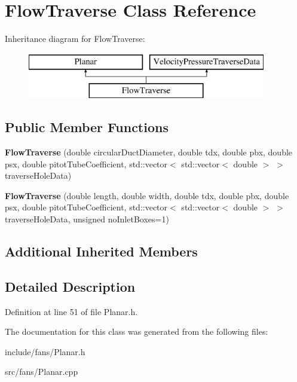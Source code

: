 \hypertarget{class_flow_traverse}{}\section{Flow\+Traverse Class Reference}
\label{class_flow_traverse}
Inheritance diagram for Flow\+Traverse\+:\begin{figure}[H]
\begin{center}
\leavevmode
\includegraphics[height=2.000000cm]{dc/dd3/class_flow_traverse}
\end{center}
\end{figure}
\subsection*{Public Member Functions}
\begin{DoxyCompactItemize}
\item 
\mbox{\label{class_flow_traverse_a95f14b9d4fb9722bad65752022813d06}} 
{\bfseries Flow\+Traverse} (double circular\+Duct\+Diameter, double tdx, double pbx, double psx, double pitot\+Tube\+Coefficient, std\+::vector$<$ std\+::vector$<$ double $>$ $>$ traverse\+Hole\+Data)
\item 
\mbox{\label{class_flow_traverse_ac96fdb9b848320a5fa9a8585ce6c0214}} 
{\bfseries Flow\+Traverse} (double length, double width, double tdx, double pbx, double psx, double pitot\+Tube\+Coefficient, std\+::vector$<$ std\+::vector$<$ double $>$ $>$ traverse\+Hole\+Data, unsigned no\+Inlet\+Boxes=1)
\end{DoxyCompactItemize}
\subsection*{Additional Inherited Members}


\subsection{Detailed Description}


Definition at line 51 of file Planar.\+h.



The documentation for this class was generated from the following files\+:\begin{DoxyCompactItemize}
\item 
include/fans/Planar.\+h\item 
src/fans/Planar.\+cpp\end{DoxyCompactItemize}
